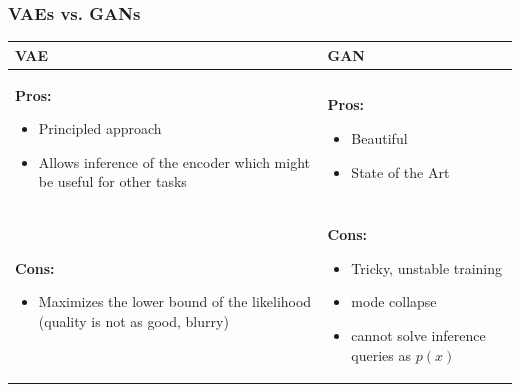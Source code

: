 \subsubsection{VAEs vs. GANs}
\begin{tabular}{ p{} | p{} }
		\textbf{VAE} & \textbf{GAN}\\\hline
  		\textbf{Pros: }
  		\begin{itemize}[leftmargin=*]
  			\item Principled approach
  			\item Allows inference of the encoder which might be useful for other tasks
  		\end{itemize}
  		& 
  		\textbf{Pros: }
  		\begin{itemize}[leftmargin=*]
  			\item Beautiful
  			\item State of the Art
  		\end{itemize}
  		\\\hline

  		\textbf{Cons: }
  		\begin{itemize}[leftmargin=*]
  			\item Maximizes the lower bound of the likelihood (quality is not as good, blurry)
  		\end{itemize}
  		&
  		\textbf{Cons: }
  		\begin{itemize}[leftmargin=*]
  			\item Tricky, unstable training
  			\item mode collapse
  			\item cannot solve inference queries as $p(x)$
  		\end{itemize} \\\hline
\end{tabular}

